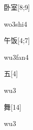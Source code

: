 \begin{verbete}[wo3shi4]{卧室}[8;9]
\begin{pronuncia}{wo3shi4}
\end{pronuncia}
\end{verbete}

\begin{verbete}[wu3fan4]{午饭}[4;7]
\begin{pronuncia}{wu3fan4}
\end{pronuncia}
\end{verbete}

\begin{verbete}[wu3]{五}[4]
\begin{pronuncia}{wu3}
\end{pronuncia}
\end{verbete}

\begin{verbete}[wu3]{舞}[14]
\begin{pronuncia}{wu3}
\end{pronuncia}
\end{verbete}

